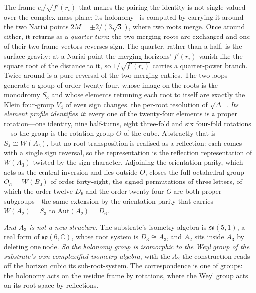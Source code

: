 \documentclass[11pt,a4paper]{article}
\theoremstyle{plain}
\theoremstyle{definition}
\theoremstyle{remark}
\newcommand{\so}{\mathfrak{so}}
\begin{document}
The frame $e_{i}/\sqrt{f'(r_{i})}$ that makes the pairing the identity is not single-valued over the complex
mass plane; its holonomy~\cite{AmbroseSinger1953} is computed by carrying it around the two Nariai points
$2M=\pm2/(3\sqrt3)$, where two roots merge. Once around either, it returns as a \emph{quarter turn}: the two
merging roots are exchanged and one of their two frame vectors reverses sign. The quarter, rather than a half,
is the surface gravity: at a Nariai point the merging horizons' $f'(r_{i})$ vanish like the square root of the
distance to it, so $1/\sqrt{f'(r_{i})}$ carries a quarter-power branch. Twice around is a pure reversal of the
two merging entries. The two loops generate a group of order twenty-four, whose image on the roots is the
monodromy $S_{3}$ and whose elements returning each root to itself are exactly the Klein four-group $V_{4}$ of
even sign changes, the per-root resolution of $\sqrt{\Delta}$~\cite{JanzenGroupoid}.
\emph{Its element profile identifies it}: every one of the twenty-four elements is a proper rotation---one
identity, nine half-turns, eight three-fold and six four-fold rotations---so the group is the rotation group $O$
of the cube. Abstractly that is
$S_{4}\cong W(A_{3})$, but no root transposition is realised as a reflection: each comes with a single sign
reversal, so the representation is the reflection representation of $W(A_{3})$ twisted by the sign character.
Adjoining the orientation parity, which acts as the central inversion and lies outside $O$, closes the full
octahedral group $O_{h}=W(B_{3})$ of order forty-eight, the signed permutations of three letters, of which the
order-twelve $D_{6}$ and the order-twenty-four $O$ are both proper
subgroups---the same extension by the
orientation parity that carries $W(A_{2})=S_{3}$ to $\mathrm{Aut}(A_{2})=D_{6}$.

\emph{And $A_{3}$ is not a new structure.} The substrate's isometry algebra is $\so(5,1)$, a real form of
$\so(6,\mathbb{C})$, whose root system is $D_{3}\cong A_{3}$, and $A_{2}$ sits inside $A_{3}$ by deleting one
node. \emph{So the holonomy group is isomorphic to the Weyl group of the substrate's own complexified isometry
algebra}, with the $A_{2}$ the construction reads off the horizon cubic its sub-root-system. The correspondence
is one of groups: the holonomy acts on the residue frame by rotations, where the Weyl group acts on its root
space by reflections.
\end{document}
